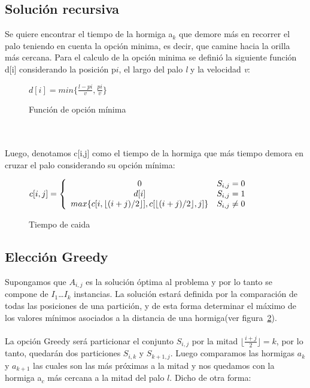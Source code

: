 \documentclass[11pt,spanish]{article}
\begin{document}
\subsection{Solución recursiva}
Se quiere encontrar el tiempo de la hormiga a$_{k}$ que demore más en recorrer el palo teniendo en cuenta la opción minima, es decir, que camine hacia la orilla más cercana. Para el calculo de la opción minima se definió la siguiente función d[i] considerando la posición p${i}$, el largo del palo \emph{l} y la velocidad \emph{v}:\\
\begin{figure}[h]
\begin{center}
$d[i] = min\{\frac{l - p{i}}{v},\frac{p{i}}{v}\}$
\caption{Función de opción mínima}
\label{fig:opmin}
\end{center}
\end{figure}
\\\\
Luego, denotamos c[i,j] como el tiempo de la hormiga que más tiempo demora en cruzar el palo considerando su opción mínima:\\
\begin{figure}[h]
\begin{center}$c[i,j] = \left\{
\begin{array}{c l}  
  0 & S_{i,j} = 0\\
  d[i] & S_{i,j} = 1\\
  max \{c[i,\lfloor(i+j)/2\rfloor],c[\lfloor(i+j)/2\rfloor,j]\} & S_{i,j} \neq 0
\end{array}
\right.
$
\caption{Tiempo de caida}
\label{fig:opmin}\end{center}
\end{figure}
\subsection{Elección Greedy}
Supongamos que $A_{i,j}$ es la solución óptima al problema y por lo tanto se compone de $I_1$\dots$I_k$ instancias. La solución estará definida por la comparación de todas las posiciones de una partición, y de esta forma determinar el máximo de los valores mínimos asociados a la distancia de una hormiga(ver figura~\ref{fig:opmin}).\\\\La opción Greedy será particionar el conjunto $S_{i,j}$ por la mitad $\lfloor\frac{i+j}{2}\rfloor = k$, por lo tanto, quedarán dos particiones $S_{i,k}$ y $S_{k+1,j}$. Luego comparamos las hormigas $a_k$ y $a_{k+1}$ las cuales son las más próximas a la mitad y nos quedamos con la hormiga a$_{c}$ más cercana a la mitad del palo $l$. Dicho de otra forma:
\end{document}
